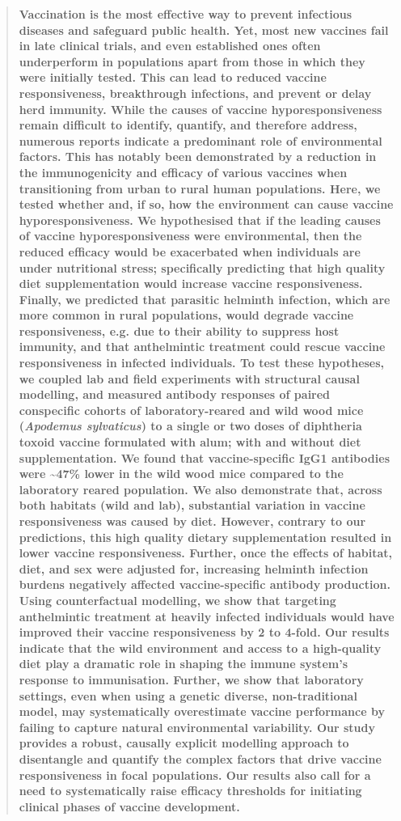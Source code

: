 \documentclass[a4paper, hidelinks, 11pt]{article}
\begin{document}
\begin{abstract}
	\textbf{Vaccination is the most effective way to prevent infectious diseases and safeguard public health. Yet, most new vaccines fail in late clinical trials, and even established ones often underperform in populations apart from those in which they were initially tested. This can lead to reduced vaccine responsiveness, breakthrough infections, and prevent or delay herd immunity. While the causes of vaccine hyporesponsiveness remain difficult to identify, quantify, and therefore address, numerous reports indicate a predominant role of environmental factors. This has notably been demonstrated by a reduction in the immunogenicity and efficacy of various vaccines when transitioning from urban to rural human populations. Here, we tested whether and, if so, how the environment can cause vaccine hyporesponsiveness. We hypothesised that if the leading causes of vaccine hyporesponsiveness were environmental, then the reduced efficacy would be exacerbated when individuals are under nutritional stress; specifically predicting that high quality diet supplementation would increase vaccine responsiveness. Finally, we predicted that parasitic helminth infection, which are more common in rural populations,  would degrade vaccine responsiveness, e.g. due to  their ability to suppress host immunity, and that anthelmintic treatment could rescue vaccine responsiveness in infected individuals. To test these hypotheses, we coupled lab and field experiments with structural causal modelling, and  measured antibody responses of paired conspecific cohorts of laboratory-reared and wild wood mice (\textit{Apodemus sylvaticus}) to a single or two doses of diphtheria toxoid vaccine formulated with alum; with and without diet supplementation. We found that  vaccine-specific IgG1 antibodies were \sim 47\% lower in the wild wood mice compared to the laboratory reared population. We also demonstrate  that, across both habitats (wild and lab), substantial variation in vaccine responsiveness was caused by diet. However, contrary to our predictions, this high quality dietary supplementation resulted in lower vaccine responsiveness. Further, once the effects of habitat, diet, and sex were adjusted for, increasing helminth infection burdens negatively affected vaccine-specific antibody production. Using counterfactual modelling, we show that targeting anthelmintic treatment at heavily infected individuals would have improved their vaccine responsiveness by 2 to 4-fold. Our results indicate that the wild environment and access to a high-quality diet play a dramatic role in shaping the immune system's response to immunisation. Further, we show  that laboratory settings, even when using a genetic diverse, non-traditional model, may systematically overestimate vaccine performance by failing to capture natural environmental variability. Our study provides a robust, causally explicit modelling approach to disentangle and quantify the complex factors that drive vaccine responsiveness in focal populations. Our results  also call for a need to systematically raise efficacy thresholds for initiating clinical phases of vaccine development.}

\end{abstract}
\end{document}
